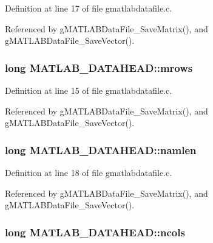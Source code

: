 Definition at line 17 of file gmatlabdatafile.\-c.



Referenced by g\-M\-A\-T\-L\-A\-B\-Data\-File\-\_\-\-Save\-Matrix(), and g\-M\-A\-T\-L\-A\-B\-Data\-File\-\_\-\-Save\-Vector().

\hypertarget{structMATLAB__DATAHEAD_abf1ef02c93522915bd7fdf9f72df44b7}{
\subsubsection[{mrows}]{\setlength{\rightskip}{0pt plus 5cm}long M\-A\-T\-L\-A\-B\-\_\-\-D\-A\-T\-A\-H\-E\-A\-D\-::mrows}}\label{structMATLAB__DATAHEAD_abf1ef02c93522915bd7fdf9f72df44b7}


Definition at line 15 of file gmatlabdatafile.\-c.



Referenced by g\-M\-A\-T\-L\-A\-B\-Data\-File\-\_\-\-Save\-Matrix(), and g\-M\-A\-T\-L\-A\-B\-Data\-File\-\_\-\-Save\-Vector().

\hypertarget{structMATLAB__DATAHEAD_ad6e65844dcff1eb1cf7bf8752ba9a91c}{
\subsubsection[{namlen}]{\setlength{\rightskip}{0pt plus 5cm}long M\-A\-T\-L\-A\-B\-\_\-\-D\-A\-T\-A\-H\-E\-A\-D\-::namlen}}\label{structMATLAB__DATAHEAD_ad6e65844dcff1eb1cf7bf8752ba9a91c}


Definition at line 18 of file gmatlabdatafile.\-c.



Referenced by g\-M\-A\-T\-L\-A\-B\-Data\-File\-\_\-\-Save\-Matrix(), and g\-M\-A\-T\-L\-A\-B\-Data\-File\-\_\-\-Save\-Vector().

\hypertarget{structMATLAB__DATAHEAD_ae87d8eca5290fa03d01c79061498626f}{
\subsubsection[{ncols}]{\setlength{\rightskip}{0pt plus 5cm}long M\-A\-T\-L\-A\-B\-\_\-\-D\-A\-T\-A\-H\-E\-A\-D\-::ncols}}\label{structMATLAB__DATAHEAD_ae87d8eca5290fa03d01c79061498626f}


